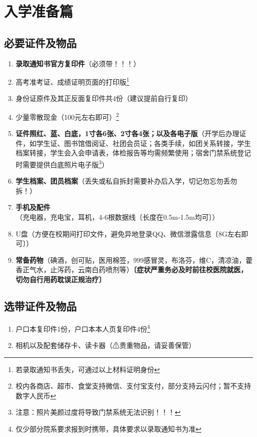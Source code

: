 \chapter[入学准备篇]{入学准备篇}
\section[必要证件及物品]{必要证件及物品}
\begin{enumerate}
    \item \textbf{录取通知书官方复印件}（必须带！！！）
    \item 高考准考证、成绩证明页面的打印版\footnote{若录取通知书丢失，可通过以上材料证明身份}
    \item 身份证原件及其正反面复印件共4份（建议提前自行复印）
    \item 少量零散现金（100元左右即可）\footnote{校内各商店、超市、食堂支持微信、支付宝支付，部分支持云闪付；暂不支持数字人民币}
    \item \textbf{证件照红、蓝、白底，1寸各6张、2寸各4张；以及各电子版}（开学后办理证件，如学生证、图书馆借阅证、社团会员证；各类手续，如团关系转接，学生档案转接，学生会入会申请表，体检报告等均需频繁使用；宿舍门禁系统登记时需要提供白底照片电子版\footnote{注意：照片美颜过度将导致门禁系统无法识别！！！}）
    \item \textbf{学生档案、团员档案}（丢失或私自拆封需要补办后入学，切记勿忘勿丢勿拆！）
    \item \textbf{手机及配件}（充电器，充电宝，耳机，4-6根数据线〔长度在0.5m-1.5m均可〕）
    \item U盘（方便在校期间打印文件，避免异地登录QQ、微信泄露信息〔8G左右即可〕）
    \item \textbf{常备药物}（碘酒，创可贴，医用棉签，999感冒灵，布洛芬，维C，清凉油，藿香正气水，止泻药，云南白药喷剂等）\textbf{〔症状严重务必及时前往校医院就医，切勿自行用药耽误正规治疗〕}
\end{enumerate}
\section[选带证件及物品]{选带证件及物品}
\begin{enumerate}
    \item 户口本复印件1份，户口本本人页复印件4份\footnote{仅少部分院系要求报到时携带，具体要求以录取通知书为准}
    \item 相机以及配套储存卡、读卡器（⚠贵重物品，请妥善保管）
\end{enumerate}
